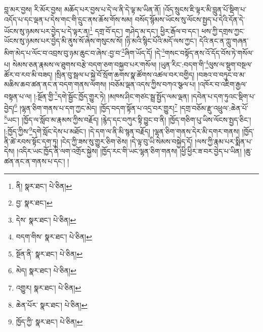 བླ་མར་བྱས། རི་མོར་བྱས། མཆོད་པར་བྱས་པ་དེ་ལ་ནི་དེ་ལྟ་མ་ཡིན་ནོ། །འོད་སྲུངས་ཇི་ལྟར་མི་བླུན་པོ་སྡིག་པ་འདོད་པ་དང་ལྡན་པ་དེས་གང་གི་དྲུང་ནས་ཆོས་གོས་སམ། བསོད་སྙོམས་ཡོངས་སུ་ལོངས་སྤྱད་པ་དེའི་དོན་དེ་ཡོངས་སུ་ཉམས་པར་བྱེད་པ་དེ་ལྟར་ན།\footnote{ནི།  སྣར་ཐང་།  པེ་ཅིན། } དགྲ་བོ་དང་། གཤེད་མ་དང་། ཕྱིར་རྒོལ་བ་དང་། ཕས་ཀྱི་དགྲས་ཀྱང་ཡོངས་སུ་ཉམས་པར་བྱེད་མི་ནུས་སོ་ཞེས་གསུངས་སོ། །ཉི་མའི་སྙིང་པོའི་མདོ་ལས་ཀྱང་། དེའི་ནང་ན་ཀླུ་གཞན་མིག་མེད་པ་ལོང་བ་འབྲས་བུ་ཉམ་ཆུང་བ་ཞེས་:བྱ་བ་\footnote{བྱ་  སྣར་ཐང་། }ཞིག་ཡོད་དོ། །དེ་\footnote{དེས་  སྣར་ཐང་།  པེ་ཅིན། }གསང་བསྟོད་ནས་འོ་དོད་བོས་ཏེ་གསོལ་པ། སེམས་ཅན་རྣམས་ལ་ཐུགས་བརྩེ་བདག་ཅག་བསྐྱབ་པར་གསོལ། །ཡུན་རིང་:བདག་གི་\footnote{བདག་གིས་  སྣར་ཐང་།  པེ་ཅིན། }ལུས་ལ་སྡུག་བསྔལ་ཚོར་བ་རབ་མི་བཟད། །སྲིན་བུ་སྦལ་པ་སྐྱེ་བོ་སྲོག་ཆགས་སྣ་ཚོགས་འཚལ་བར་བགྱིད། །བཟའ་བ་བཏུང་བ་མ་མཆིས་ཆབ་ཚན་ནང་ན་བདག་གནས་ལགས། །བཅོམ་ལྡན་འདས་ཀྱིས་བཀའ་སྩལ་པ། །འཁོར་བ་འཇིག་རྒྱལ་བསྟན་པ་ལ། །:སྔོན་གྱི་\footnote{སྔོན་ནི་  སྣར་ཐང་།  པེ་ཅིན། }དགེ་སྦྱོང་ཁྱོད་གྱུར་ཏེ། །མཁས་ཤིང་གཙང་སྦྲ་སྤྱོད་ལམ་ལྡན། །དབེན་པ་དག་ཏུའང་སྡིག་པ་བྱེད།\footnote{མེད།  སྣར་ཐང་།  པེ་ཅིན། } །ལྷན་ཅིག་གནས་པ་དག་ཀྱང་མེད། །ཁྱོད་བདག་སྟོན་པ་འདྲ་བར་གྱུར།\footnote{འགྱུར།  སྣར་ཐང་།  པེ་ཅིན། } །དགྲ་བཅོམ་རྫུ་འཕྲུལ་:ཆེན་པོ་\footnote{ཆེན་པོར་  སྣར་ཐང་།  པེ་ཅིན། }ཡང་། །ཁྱོད་ལ་སློབ་མ་རྣམས་ཀྱིས་བརྗོད། །རྙེད་དང་བཀུར་སྟི་བྱུང་བ་ནི། །ཁྱོད་གཅིག་པུ་ཡིས་ལོངས་སྤྱད་ཅིང་། །:ཁྱོད་ཀྱིས་\footnote{ཁྱོད་ཀྱི་  སྣར་ཐང་།  པེ་ཅིན། }དགེ་སློང་དེས་པ་མཐོང་། །དེ་དག་ལ་ནི་མི་སྙན་བརྗོད། །ལྷན་ཅིག་གནས་དེར་མི་དགར་གནས། །ཁྱོད་ནི་ཚེ་རབས་སྟོང་དག་ཏུ། །ངེད་ཀྱི་ཟས་སུ་གྱུར་ཅིག་ཅེས། །དེ་ལྟ་བུ་ཡི་སེམས་བསྐྱེད་དོ། །ལས་ཀྱི་རྣམ་པར་སྨིན་པ་དེས། །འདིར་ཡང་ཁྱོད་ནི་ལག་འགྲོར་སྐྱེས། །ཁྱོད་རང་གི་ཡང་ལྷན་ཅིག་གནས། །ཕྱི་ཕྱིར་ཟ་བར་བྱེད་པ་ཡིན། །ཆུ་ཚན་ནང་ན་གནས་པ་དང་། །
